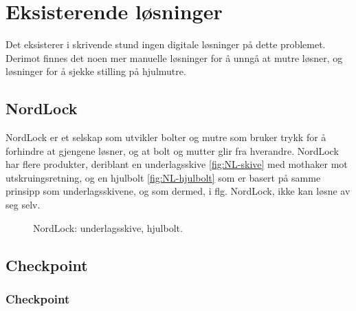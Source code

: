 \section{Eksisterende løsninger}
Det eksisterer i skrivende stund ingen digitale løsninger på dette problemet. 
Derimot finnes det noen mer manuelle løsninger for å unngå at mutre løsner, 
og løsninger for å sjekke stilling på hjulmutre.
\subsection{NordLock}
NordLock er et selskap som utvikler bolter og mutre som bruker trykk for å forhindre 
at gjengene løsner, og at bolt og mutter glir fra hverandre. NordLock har flere 
produkter, deriblant en underlagsskive \ref{fig:NL-skive}\cite{NL-skive} med mothaker mot 
utskruingsretning, og en hjulbolt 
\ref{fig:NL-hjulbolt}\cite{NL-hjulbolt} som er basert på samme prinsipp som 
underlagsskivene, og som dermed, i flg. NordLock, ikke kan løsne av seg selv.
\newline
\begin{figure}[H]
%
\hfill
{}%
\caption{NordLock: \protect{\ref{fig:NL-skive}} underlagsskive, \protect{\ref{fig:NL-hjulbolt}} hjulbolt.}
\end{figure}


\subsection{Checkpoint}
\cite{checkpoint1}
\subsubsection{Checkpoint}
